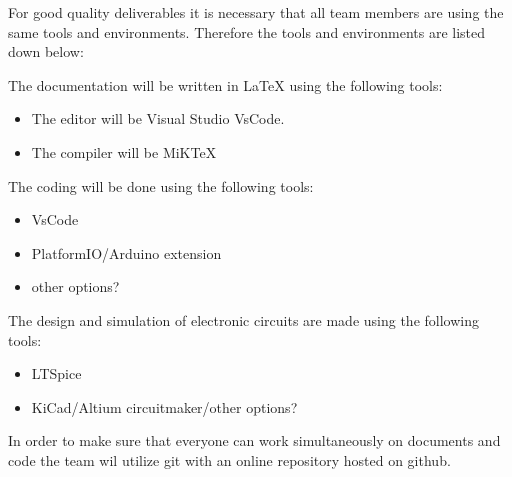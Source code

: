 For good quality deliverables it is necessary that all team members are using the same tools and environments. Therefore the tools and environments are listed down below:

The documentation will be written in LaTeX using the following tools:
\begin{itemize} 
    \setlength\itemsep{-0.3em}
    \item The editor will be Visual Studio VsCode.
    \item The compiler will be MiKTeX
\end{itemize}

The coding will be done using the following tools:
\begin{itemize}
    \item VsCode
    \item PlatformIO/Arduino extension
    \item other options?
\end{itemize}

The design and simulation of electronic circuits are made using the following tools:
\begin{itemize}
    \item LTSpice
    \item KiCad/Altium circuitmaker/other options?
\end{itemize}

In order to make sure that everyone can work simultaneously on documents and code the team wil utilize git with an online repository hosted on github.